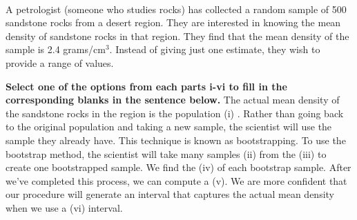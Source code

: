 \\[10pt]
A petrologist (someone who studies rocks) has collected a random sample of 500 sandstone rocks from a desert region. They are interested in knowing the mean density of sandstone rocks in that region. They find that the mean density of the sample is 2.4 grams/cm$^3$. Instead of giving just one estimate, they wish to provide a range of values.

\begin{enumerate}
     \textbf{Select one of the options from each parts i-vi to fill in the corresponding blanks in the sentence below.}
    \vskip 0.05in
    The actual mean density of the sandstone rocks in the region is the population \underline{\hspace{0.25in}}(i)\underline{\hspace{0.25in}} . Rather than going back to the original population and taking a new sample, the scientist will use the sample they already have. This technique is known as bootstrapping.  To use the bootstrap method, the scientist will take many samples \underline{\hspace{0.25in}}(ii)\underline{\hspace{0.25in}} from the \underline{\hspace{0.25in}}(iii)\underline{\hspace{0.25in}} to create one bootstrapped sample. We find the \underline{\hspace{0.25in}}(iv)\underline{\hspace{0.25in}} of each bootstrap sample. After we've completed this process, we can compute a \underline{\hspace{0.25in}}(v)\underline{\hspace{0.25in}}. We are more confident that our procedure will generate an interval that captures the actual mean density when we use a \underline{\hspace{0.25in}}(vi)\underline{\hspace{0.25in}} interval.
    
        \vskip 0.1in
        

\end{enumerate}
